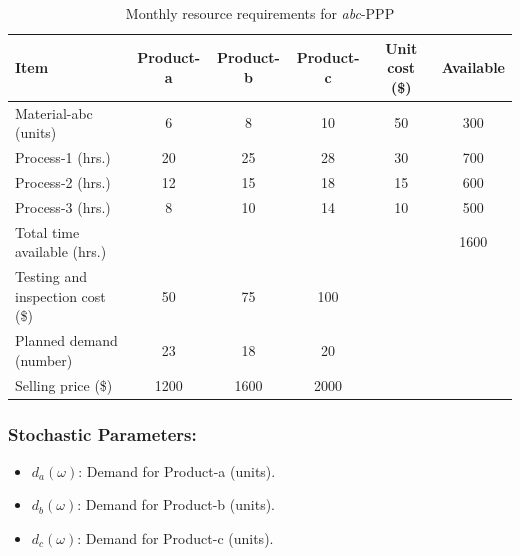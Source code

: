 \documentclass[7pt]{article}
\begin{document}
\begin{table}[h!]
    \footnotesize
    \captionsetup{skip=3pt}
    \centering
    \caption{Monthly resource requirements for \textit{abc}-PPP}
    \begin{tabular}{|l|c|c|c|c|c|}
        \hline
        Item                             & Product-a & Product-b & Product-c & Unit cost (\$) & Available \\
        \hline
        Material-abc (units)             & 6         & 8         & 10        & 50             & 300       \\
        Process-1 (hrs.)                 & 20        & 25        & 28        & 30             & 700       \\
        Process-2 (hrs.)                 & 12        & 15        & 18        & 15             & 600       \\
        Process-3 (hrs.)                 & 8         & 10        & 14        & 10             & 500       \\
        \hline
        Total time available (hrs.)      &           &           &           &                & 1600      \\
        \hline
        Testing and inspection cost (\$) & 50        & 75        & 100       &                &           \\
        Planned demand (number)          & 23        & 18        & 20        &                &           \\
        Selling price (\$)               & 1200      & 1600      & 2000      &                &           \\
        \hline
    \end{tabular}
\end{table}
\subsubsection*{Stochastic Parameters:}
\vspace{-0.5em}
\begin{itemize}[leftmargin=1.5em, labelsep=0.5em]
    \item $d_a(\omega)$: Demand for Product-a (units).
    \item $d_b(\omega)$: Demand for Product-b (units).
    \item $d_c(\omega)$: Demand for Product-c (units).
\end{itemize}

\vspace{0.2em}
\end{document}
